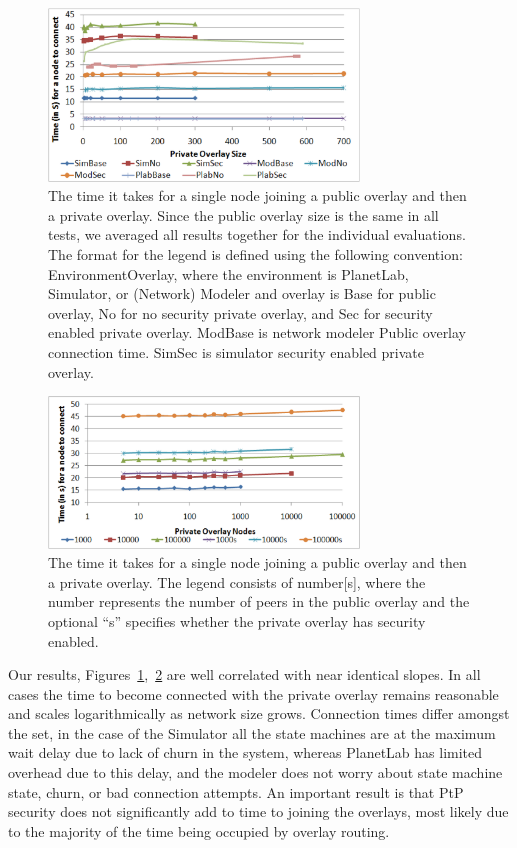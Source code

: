 \documentclass[conference]{IEEEtran}
\begin{document}
\begin{figure}[h]
\centering
\includegraphics[width=3.25in]{single_join.eps}
\caption{The time it takes for a single node joining a public overlay and then
a private overlay. Since the public overlay size is the same in all tests, we
averaged all results together for the individual evaluations.  The format for
the legend is defined using the following convention: EnvironmentOverlay,
where the environment is PlanetLab, Simulator, or (Network) Modeler and
overlay is Base for public overlay, No for no security private overlay, and
Sec for security enabled private overlay. ModBase is network modeler
Public overlay connection time.  SimSec is simulator security enabled private
overlay.}
\label{fig:single_join}
\end{figure}


\begin{figure}[h]
\centering
\includegraphics[width=3.25in]{single_join_mod.eps}
\caption{The time it takes for a single node joining a public overlay and then
a private overlay. The legend consists of number[s], where the number
represents the number of peers in the public overlay and the optional ``s''
specifies whether the private overlay has security enabled.}
\label{fig:single_join_mod}
\end{figure}

Our results, Figures~\ref{fig:single_join},~\ref{fig:single_join_mod} are well
correlated with near identical slopes.  In all cases the time to become
connected with the private overlay remains reasonable and scales logarithmically
as network size grows.  Connection times differ amongst the set, in the case of
the Simulator all the state machines are at the maximum wait delay due to lack of
churn in the system, whereas PlanetLab has limited overhead due to this
delay, and the modeler does not worry about state machine state,
churn, or bad connection attempts.  An important result is that PtP security
does not significantly add to time to joining the overlays, most likely due
to the majority of the time being occupied by overlay routing.
\end{document}
